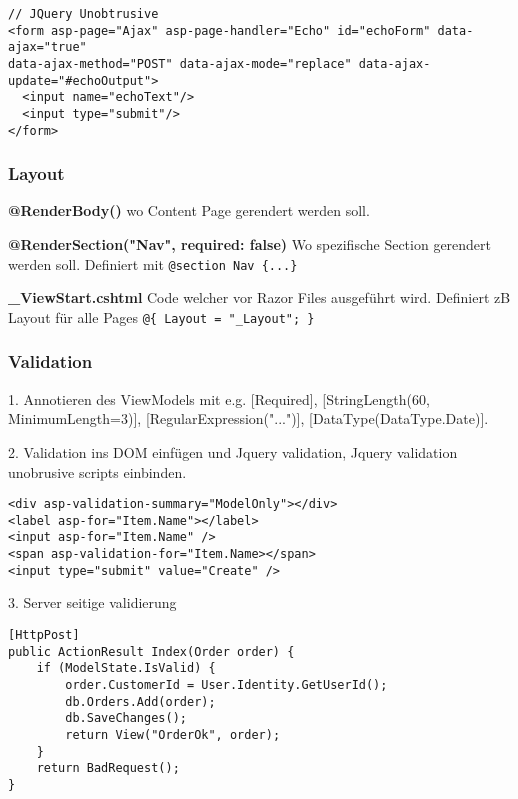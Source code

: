 \begin{multicols*}{2}
\begin{verbatim}
// JQuery Unobtrusive
<form asp-page="Ajax" asp-page-handler="Echo" id="echoForm" data-ajax="true"
data-ajax-method="POST" data-ajax-mode="replace" data-ajax-update="#echoOutput">
  <input name="echoText"/>
  <input type="submit"/>
</form>
\end{verbatim}

\subsubsection{Layout}
\textbf{@RenderBody()} wo Content Page gerendert werden soll.

\textbf{@RenderSection("Nav", required: false)} Wo spezifische Section gerendert werden soll. Definiert mit \lstinline|@section Nav {...}|

\textbf{\_ViewStart.cshtml} Code welcher vor Razor Files ausgeführt wird. Definiert zB Layout für alle Pages \lstinline|@{ Layout = "_Layout"; }|

\subsubsection{Validation}
1. Annotieren des ViewModels mit e.g. [Required], [StringLength(60, MinimumLength=3)], [RegularExpression("...")], [DataType(DataType.Date)].

2. Validation ins DOM einfügen und Jquery validation, Jquery validation unobrusive scripts einbinden.
\begin{verbatim}
<div asp-validation-summary="ModelOnly"></div>
<label asp-for="Item.Name"></label>
<input asp-for="Item.Name" />
<span asp-validation-for="Item.Name></span>
<input type="submit" value="Create" />
\end{verbatim}

3. Server seitige validierung
\begin{verbatim}
[HttpPost]
public ActionResult Index(Order order) {
    if (ModelState.IsValid) {
        order.CustomerId = User.Identity.GetUserId();
        db.Orders.Add(order);
        db.SaveChanges();
        return View("OrderOk", order);
    }
    return BadRequest();
}
\end{verbatim}


\end{multicols*}
